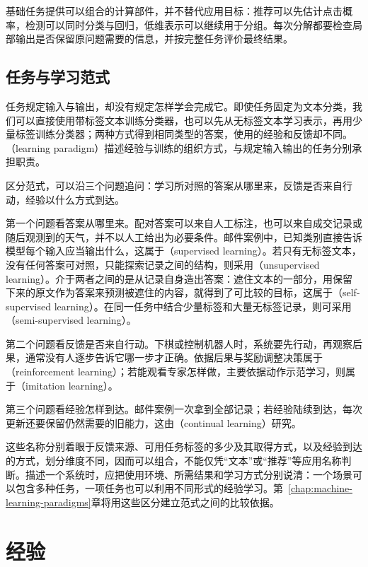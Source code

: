 基础任务提供可以组合的计算部件，并不替代应用目标：推荐可以先估计点击概率，检测可以同时分类与回归，低维表示可以继续用于分组。每次分解都要检查局部输出是否保留原问题需要的信息，并按完整任务评价最终结果。

\subsection{任务与学习范式}
\label{sec:task-and-learning-paradigm}

任务规定输入与输出，却没有规定怎样学会完成它。即使任务固定为文本分类，我们可以直接使用带标签文本训练分类器，也可以先从无标签文本学习表示，再用少量标签训练分类器；两种方式得到相同类型的答案，使用的经验和反馈却不同。（learning paradigm）描述经验与训练的组织方式，与规定输入输出的任务分别承担职责。

区分范式，可以沿三个问题追问：学习所对照的答案从哪里来，反馈是否来自行动，经验以什么方式到达。

第一个问题看答案从哪里来。配对答案可以来自人工标注，也可以来自成交记录或随后观测到的天气，并不以人工给出为必要条件。邮件案例中，已知类别直接告诉模型每个输入应当输出什么，这属于（supervised learning）。若只有无标签文本，没有任何答案可对照，只能探索记录之间的结构，则采用（unsupervised learning）。介于两者之间的是从记录自身造出答案：遮住文本的一部分，用保留下来的原文作为答案来预测被遮住的内容，就得到了可比较的目标，这属于（self-supervised learning）。在同一任务中结合少量标签和大量无标签记录，则可采用（semi-supervised learning）。

第二个问题看反馈是否来自行动。下棋或控制机器人时，系统要先行动，再观察后果，通常没有人逐步告诉它哪一步才正确。依据后果与奖励调整决策属于（reinforcement learning）；若能观看专家怎样做，主要依据动作示范学习，则属于（imitation learning）。

第三个问题看经验怎样到达。邮件案例一次拿到全部记录；若经验陆续到达，每次更新还要保留仍然需要的旧能力，这由（continual learning）研究。

这些名称分别着眼于反馈来源、可用任务标签的多少及其取得方式，以及经验到达的方式，划分维度不同，因而可以组合，不能仅凭“文本”或“推荐”等应用名称判断。描述一个系统时，应把使用环境、所需结果和学习方式分别说清：一个场景可以包含多种任务，一项任务也可以利用不同形式的经验学习。第~\ref{chap:machine-learning-paradigms}章将用这些区分建立范式之间的比较依据。

\section{经验}
\label{sec:machine-learning-data}

